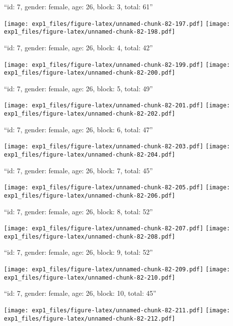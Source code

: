 \documentclass[11pt,,]{article}
\begin{document}
\newpage
[1] 

``id: 7, gender: female, age: 26, block: 3, total: 61''

\texttt{[image: exp1\_files/figure-latex/unnamed-chunk-82-197.pdf]}
\texttt{[image: exp1\_files/figure-latex/unnamed-chunk-82-198.pdf]}

\newpage
[1] 

``id: 7, gender: female, age: 26, block: 4, total: 42''

\texttt{[image: exp1\_files/figure-latex/unnamed-chunk-82-199.pdf]}
\texttt{[image: exp1\_files/figure-latex/unnamed-chunk-82-200.pdf]}

\newpage
[1] 

``id: 7, gender: female, age: 26, block: 5, total: 49''

\texttt{[image: exp1\_files/figure-latex/unnamed-chunk-82-201.pdf]}
\texttt{[image: exp1\_files/figure-latex/unnamed-chunk-82-202.pdf]}

\newpage
[1] 

``id: 7, gender: female, age: 26, block: 6, total: 47''

\texttt{[image: exp1\_files/figure-latex/unnamed-chunk-82-203.pdf]}
\texttt{[image: exp1\_files/figure-latex/unnamed-chunk-82-204.pdf]}

\newpage
[1] 

``id: 7, gender: female, age: 26, block: 7, total: 45''

\texttt{[image: exp1\_files/figure-latex/unnamed-chunk-82-205.pdf]}
\texttt{[image: exp1\_files/figure-latex/unnamed-chunk-82-206.pdf]}

\newpage
[1] 

``id: 7, gender: female, age: 26, block: 8, total: 52''

\texttt{[image: exp1\_files/figure-latex/unnamed-chunk-82-207.pdf]}
\texttt{[image: exp1\_files/figure-latex/unnamed-chunk-82-208.pdf]}

\newpage
[1] 

``id: 7, gender: female, age: 26, block: 9, total: 52''

\texttt{[image: exp1\_files/figure-latex/unnamed-chunk-82-209.pdf]}
\texttt{[image: exp1\_files/figure-latex/unnamed-chunk-82-210.pdf]}

\newpage
[1] 

``id: 7, gender: female, age: 26, block: 10, total: 45''

\texttt{[image: exp1\_files/figure-latex/unnamed-chunk-82-211.pdf]}
\texttt{[image: exp1\_files/figure-latex/unnamed-chunk-82-212.pdf]}
\end{document}
